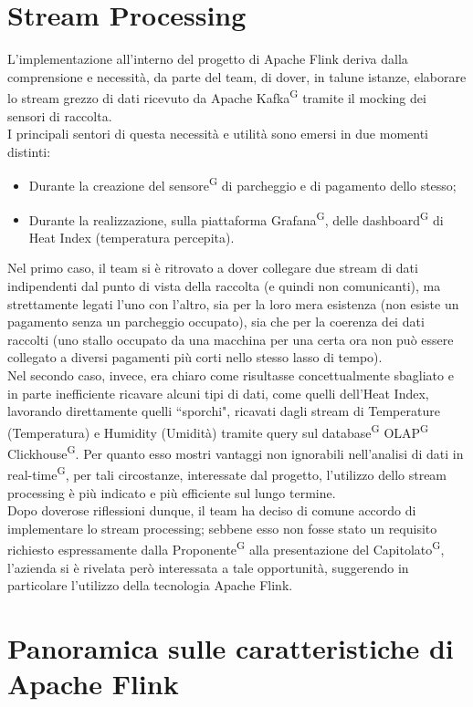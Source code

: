 \documentclass[8pt]{article}
\newcommand{\glossterm}[1]{#1\textsuperscript{G}} %
\begin{document}
\section{Stream Processing}
L'implementazione all'interno del progetto di Apache Flink deriva dalla comprensione e necessità, da parte del team, di dover, in talune istanze,
elaborare lo stream grezzo di dati ricevuto da Apache \glossterm{Kafka} tramite il mocking dei sensori di raccolta.\\
I principali sentori di questa necessità e utilità sono emersi in due momenti distinti:
\begin{itemize}
    \item Durante la creazione del \glossterm{sensore} di parcheggio e di pagamento dello stesso;
    \item Durante la realizzazione, sulla piattaforma \glossterm{Grafana}, delle \glossterm{dashboard} di Heat Index (temperatura percepita).
\end{itemize}
Nel primo caso, il team si è ritrovato a dover collegare due stream di dati indipendenti dal punto di vista della raccolta (e quindi non comunicanti),
ma strettamente legati l'uno con l'altro, sia per la loro mera esistenza (non esiste un pagamento senza un parcheggio occupato), sia che per la coerenza
dei dati raccolti (uno stallo occupato da una macchina per una certa ora non può essere collegato a diversi pagamenti più corti nello stesso lasso di tempo).\\
Nel secondo caso, invece, era chiaro come risultasse concettualmente sbagliato e in parte inefficiente ricavare alcuni tipi di dati, 
come quelli dell'Heat Index, lavorando direttamente quelli ``sporchi", ricavati dagli stream di Temperature (Temperatura) e Humidity (Umidità) tramite query sul 
\glossterm{database} \glossterm{OLAP} \glossterm{Clickhouse}. Per quanto esso mostri vantaggi non ignorabili nell'analisi di dati in \glossterm{real-time}, per tali circostanze, interessate dal 
progetto, l'utilizzo dello stream processing è più indicato e più efficiente sul lungo termine.\\
Dopo doverose riflessioni dunque, il team ha deciso di comune accordo di implementare lo stream processing; sebbene esso non fosse stato un requisito
richiesto espressamente dalla \glossterm{Proponente} alla presentazione del \glossterm{Capitolato}, l'azienda si è rivelata però interessata a tale opportunità, suggerendo in particolare 
l'utilizzo della tecnologia Apache Flink. 
\section{Panoramica sulle caratteristiche di Apache Flink}
\end{document}

